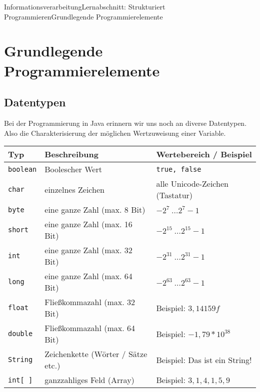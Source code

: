 \documentclass[11pt,oneside,openany,headings=optiontotoc,11pt,numbers=noenddot]{article}
\begin{document}
	\begin{worksheet}{Informationsverarbeitung}{Lernabschnitt: Strukturiert Programmieren}{Grundlegende Programmierelemente}
		\setlength{\columnseprule}{0pt}
		\setcounter{section}{4}
		\setcounter{page}{16}
		\section{Grundlegende Programmierelemente}
		\subsection{Datentypen}
		\label{datyp}
		Bei der Programmierung in Java erinnern wir uns noch an diverse Datentypen. Also die Charakterisierung der möglichen Wertzuweisung einer Variable.\\
		\par\noindent
		\begin{tabularx}{\textwidth}{lXX}
			\textbf{Typ} & \textbf{Beschreibung} & \textbf{Wertebereich / Beispiel}\\
			\hline
			\hline
			{\lstinline[style=JavaInputStyle]{boolean}} & Boolescher Wert & {\lstinline[style=JavaInputStyle]{true, false}}\\
			\hline
			{\lstinline[style=JavaInputStyle]{char}} & einzelnes Zeichen & alle Unicode-Zeichen (Tastatur)\\
			\hline
			{\lstinline[style=JavaInputStyle]{byte}} & eine ganze Zahl (max. 8 Bit) & \(-2^7\ \ldots 2^7-1\)\\
			\hdashline
			{\lstinline[style=JavaInputStyle]{short}} & eine ganze Zahl (max. 16 Bit) & \(-2^{15}\ \ldots 2^{15}-1\)\\
			\hdashline
			{\lstinline[style=JavaInputStyle]{int}} & eine ganze Zahl (max. 32 Bit) & \(-2^{31}\ \ldots 2^{31}-1\)\\
			\hdashline
			{\lstinline[style=JavaInputStyle]{long}} & eine ganze Zahl (max. 64 Bit) & \(-2^{63}\ \ldots 2^{63}-1\)\\
			\hline
			{\lstinline[style=JavaInputStyle]{float}} & Fließkommazahl (max. 32 Bit) & Beispiel: \(3,14159f\)\\
			\hdashline
			{\lstinline[style=JavaInputStyle]{double}} & Fließkommazahl (max. 64 Bit) & Beispiel: \(-1,79 * 10^{38}\)\\
			\hline
			{\lstinline[style=JavaInputStyle]{String}} & Zeichenkette (Wörter / Sätze etc.) & Beispiel: \glqq{}Das ist ein String!\grqq{}\\
			\hdashline
			{\lstinline[style=JavaInputStyle]{int[ ]}} & ganzzahliges Feld (Array) & Beispiel: \({3,1,4,1,5,9}\)\\

\end{tabularx}
\end{worksheet}
\end{document}

